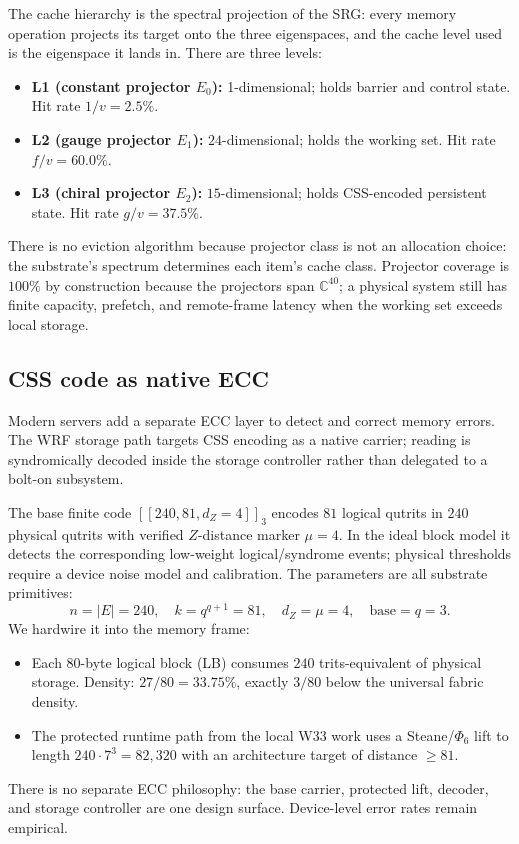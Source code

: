 \documentclass[11pt,letterpaper]{article}
\theoremstyle{remark}
\newcommand{\CC}{\mathbb{C}}
\begin{document}
The cache hierarchy is the spectral projection of the SRG: every memory operation
projects its target onto the three eigenspaces, and the cache level used is the
eigenspace it lands in. There are three levels:
\begin{itemize}[leftmargin=2em,nosep]
\item \textbf{L1 (constant projector $E_0$):} 1-dimensional; holds barrier and control
state. Hit rate $1/v = 2.5\%$.
\item \textbf{L2 (gauge projector $E_1$):} $24$-dimensional; holds the working set. Hit
rate $f/v = 60.0\%$.
\item \textbf{L3 (chiral projector $E_2$):} $15$-dimensional; holds CSS-encoded
persistent state. Hit rate $g/v = 37.5\%$.
\end{itemize}
There is no eviction algorithm because projector class is not an allocation choice: the
substrate's spectrum determines each item's cache class. Projector coverage is $100\%$ by
construction because the projectors span $\CC^{40}$; a physical system still has finite
capacity, prefetch, and remote-frame latency when the working set exceeds local storage.

\subsection{CSS code as native ECC}

\begin{intuition}
Modern servers add a separate ECC layer to detect and correct memory errors. The WRF
storage path targets CSS encoding as a native carrier; reading is syndromically decoded
inside the storage controller rather than delegated to a bolt-on subsystem.
\end{intuition}

The base finite code $[[240, 81, d_Z=4]]_3$ encodes $81$ logical qutrits in $240$
physical qutrits with verified $Z$-distance marker $\mu = 4$. In the ideal block model it
detects the corresponding low-weight logical/syndrome events; physical thresholds require
a device noise model and calibration. The
parameters are all substrate primitives:
\[
n = |E| = 240, \quad k = q^{q+1} = 81, \quad d_Z = \mu = 4, \quad \text{base} = q = 3.
\]
We hardwire it into the memory frame:
\begin{itemize}[leftmargin=2em,nosep]
\item Each $80$-byte logical block (LB) consumes $240$ trits-equivalent of physical
storage. Density: $27/80 = 33.75\%$, exactly $3/80$ below the universal fabric density.
\item The protected runtime path from the local W33 work uses a Steane/$\Phi_6$ lift to
length $240\cdot 7^3 = 82{,}320$ with an architecture target of distance $\geq 81$.
\end{itemize}
There is no separate ECC philosophy: the base carrier, protected lift, decoder, and
storage controller are one design surface. Device-level error rates remain empirical.
\end{document}
